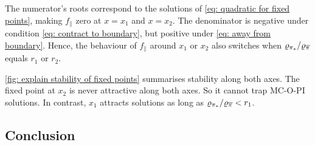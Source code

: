 % 
The numerator's roots correspond to the solutions of \eqref{eq: quadratic for fixed points}, making $f_\parallel$ zero at $x=x_1$ and $x=x_2$.
The denominator is negative under
condition \eqref{eq: contract to boundary}, but positive under \eqref{eq: away from boundary}. Hence, the behaviour of $f_\parallel$ around $x_1$ or $x_2$ also switches when $\varrho_{{\pi}_*}/\varrho_{\overline{\pi}}$ equals $r_1$ or $r_2$.



\autoref{fig: explain stability of fixed points} summarises stability along both axes.
The fixed point at $x_2$ is never attractive along both axes. So it cannot trap MC-O-PI solutions.
In contrast, $x_1$ attracts solutions as long as $\varrho_{{\pi}_*} / \varrho_{\overline{\pi}} < r_1$.




\subsection{Conclusion}


